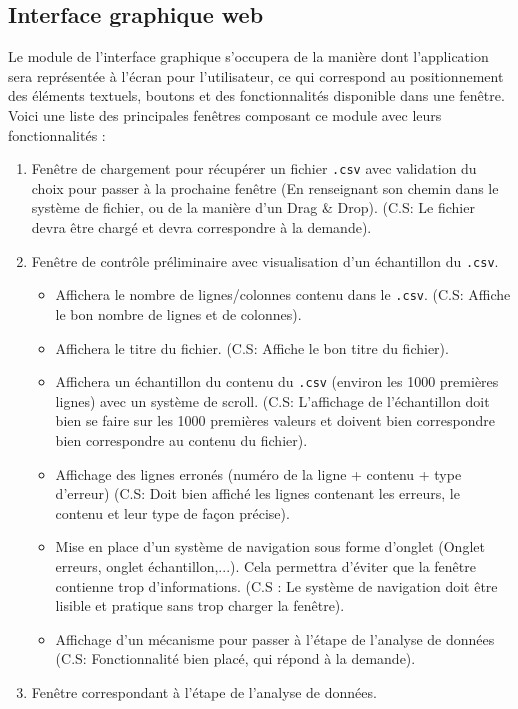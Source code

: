 		\subsection{Interface graphique web}
			Le module de l'interface graphique s'occupera de la manière dont l'application sera représentée à l'écran pour l'utilisateur, ce qui correspond au positionnement des éléments textuels, boutons et des fonctionnalités disponible dans une fenêtre. Voici une liste des principales fenêtres composant ce module avec leurs fonctionnalités :
			\begin{enumerate}
			\item Fenêtre de chargement pour récupérer un fichier \lstinline!.csv! avec validation du choix pour passer à la prochaine fenêtre (En renseignant son chemin dans le système de fichier, ou de la manière d'un Drag \& Drop). (C.S: Le fichier devra être chargé  et devra correspondre à la demande).
			\item Fenêtre de contrôle préliminaire avec visualisation d'un échantillon du \lstinline!.csv!.		
				\begin{itemize}
				\item Affichera le nombre de lignes/colonnes contenu dans le \lstinline!.csv!. (C.S: Affiche le bon nombre de lignes et de colonnes).
				\item Affichera le titre du fichier. (C.S: Affiche le bon titre du fichier).
				\item Affichera un échantillon du contenu du \lstinline!.csv! (environ les 1000 premières lignes) avec un système de scroll. (C.S: L'affichage de l'échantillon doit bien se faire sur les 1000 premières valeurs et doivent bien correspondre bien correspondre au contenu du fichier). 
				\item Affichage des lignes erronés (numéro de la ligne + contenu + type d'erreur) (C.S: Doit bien affiché les lignes contenant les erreurs, le contenu et leur type de façon précise).
				\item Mise en place d'un système de navigation sous forme d'onglet (Onglet erreurs, onglet échantillon,...). Cela permettra d'éviter que la fenêtre contienne trop d'informations. (C.S : Le système de navigation doit être lisible et pratique sans trop charger la fenêtre).
				\item Affichage d'un mécanisme pour passer à l'étape de l'analyse de données (C.S: Fonctionnalité bien placé, qui répond à la demande).
				\end{itemize}
			\item Fenêtre correspondant à l'étape de l'analyse de données.

\end{enumerate}

